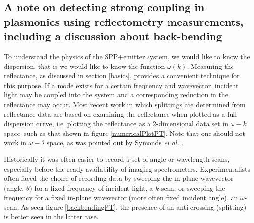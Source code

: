 \documentclass[12pt]{iopart}
\begin{document}
\subsection{A note on detecting strong coupling in plasmonics using reflectometry measurements, including a discussion about back-bending}
\label{ReflectometryForSC}

To understand the physics of the SPP+emitter system, we would like to know the dispersion, that is we would like to know the function $\omega (k)$. Measuring the reflectance, as discussed in section \ref{basics}, provides a convenient technique for this purpose. If a mode exists for a certain frequency and wavevector, incident light may be coupled into the system and a corresponding reduction in the reflectance may occur. Most recent work in which splittings are determined from reflectance data are based on examining the reflectance when plotted as a full dispersion curve, i.e. plotting the reflectance as a 2-dimensional data set in $\omega-k$ space, such as that shown in figure \ref{numericalPlotPT}. Note that one should not work in $\omega-\theta$ space,  as was pointed out by Symonds {\it et al.} \cite{symonds2008}. 

Historically it was often easier to record a set of angle or wavelength scans, especially before the ready availability of imaging spectrometers. Experimentalists often faced the choice of recording data by sweeping the in-plane wavevector (angle, $\theta$) for a fixed frequency of incident light, a $k$-scan, or sweeping the frequency for a fixed in-plane wavevector (more often fixed incident angle), an $\omega$-scan. As seen figure \ref{backbendingPT}, the presence of an anti-crossing (splitting) is better seen in the latter case.
\end{document}
